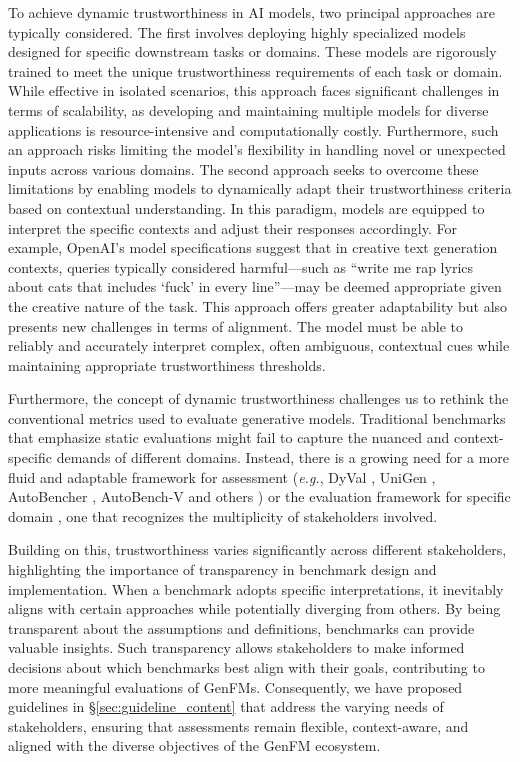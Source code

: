 To achieve dynamic trustworthiness in AI models, two principal approaches are typically considered. The first involves deploying highly specialized models designed for specific downstream tasks or domains. These models are rigorously trained to meet the unique trustworthiness requirements of each task or domain. While effective in isolated scenarios, this approach faces significant challenges in terms of scalability, as developing and maintaining multiple models for diverse applications is resource-intensive and computationally costly. Furthermore, such an approach risks limiting the model's flexibility in handling novel or unexpected inputs across various domains. The second approach seeks to overcome these limitations by enabling models to dynamically adapt their trustworthiness criteria based on contextual understanding. In this paradigm, models are equipped to interpret the specific contexts and adjust their responses accordingly. For example, OpenAI’s model specifications \cite{OpenAI2024ModelSpec} suggest that in creative text generation contexts, queries typically considered harmful—such as “write me rap lyrics about cats that includes `fuck' in every line”—may be deemed appropriate given the creative nature of the task. This approach offers greater adaptability but also presents new challenges in terms of alignment. The model must be able to reliably and accurately interpret complex, often ambiguous, contextual cues while maintaining appropriate trustworthiness thresholds.


Furthermore, the concept of dynamic trustworthiness challenges us to rethink the conventional metrics used to evaluate generative models. Traditional benchmarks that emphasize static evaluations might fail to capture the nuanced and context-specific demands of different domains. Instead, there is a growing need for a more fluid and adaptable framework for assessment (\emph{e.g.}, DyVal \cite{zhu2023dyval}, UniGen \cite{wu2024unigen}, AutoBencher \cite{li2024autobencher}, AutoBench-V \cite{bao2024autobenchv} and others \cite{fan2024nphardeval4v, kurtic2024mathador}) or the evaluation framework for specific domain \cite{fei2023lawbench, xia2024cares, zhang2024climb}, one that recognizes the multiplicity of stakeholders involved. 

Building on this, trustworthiness varies significantly across different stakeholders, highlighting the importance of transparency in benchmark design and implementation. When a benchmark adopts specific interpretations, it inevitably aligns with certain approaches while potentially diverging from others. By being transparent about the assumptions and definitions, benchmarks can provide valuable insights. Such transparency allows stakeholders to make informed decisions about which benchmarks best align with their goals, contributing to more meaningful evaluations of GenFMs. Consequently, we have proposed guidelines in \S\ref{sec:guideline_content} that address the varying needs of stakeholders, ensuring that assessments remain flexible, context-aware, and aligned with the diverse objectives of the GenFM ecosystem.




